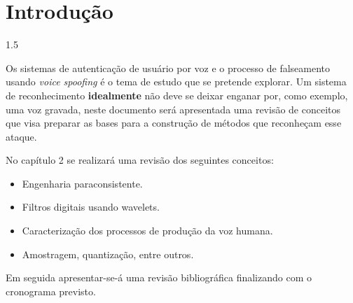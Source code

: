 \documentclass[a4paper,12pt,openright,oneside]{book}
\newenvironment{myenv}[1]
  {\begin{spacing}{#1}}
  {\end{spacing}}
\begin{document}
	\cleardoublepage
	\listoffigures
	
	\cleardoublepage
	\listoftables
	\frontmatter
	
	\def\contentsname{Sumário} 
	\tableofcontents
	\cleardoublepage
	
	\mainmatter
	\setlength{\parindent}{1.25cm}

	\chapter{Introdução}
		\begin{myenv}{1.5}
			\setcounter{page}{12}
			\par Os sistemas de autenticação de usuário por voz e o processo de falseamento usando \textit{voice spoofing} é o tema de estudo que se pretende explorar. Um sistema de reconhecimento \textbf{idealmente} não deve se deixar enganar por, como exemplo, uma voz gravada, neste documento será apresentada uma revisão de conceitos que visa preparar as bases para a construção de métodos que reconheçam esse ataque.
			
			\par No capítulo 2 se realizará uma revisão dos seguintes conceitos:
			\begin{itemize}
				\item Engenharia paraconsistente.
				\item Filtros digitais usando wavelets.
				\item Caracterização dos processos de produção da voz humana.
				\item Amostragem, quantização, entre outros.
			\end{itemize}
			\par Em seguida apresentar-se-á uma revisão bibliográfica finalizando com o cronograma previsto.
		\end{myenv}
\end{document}
